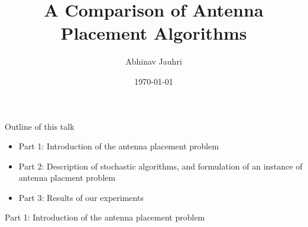 \documentclass{beamer}
\title{\color{univred} A Comparison of Antenna Placement Algorithms}
\author{Abhinav Jauhri}
\date{\today}
\begin{document}
    \begin{frame}
        \color{univred}
        \titlepage
    \end{frame}

    \begin{frame}{Outline of this talk}
        \begin{itemize}
            \setlength\itemsep{2em}
            \item Part 1: Introduction of the antenna placement problem
            \item Part 2: Description of stochastic algorithms, and formulation of an instance of antenna placment problem
            \item Part 3: Results of our experiments
        \end{itemize}
    \end{frame}

    \begin{frame}{\null}
        \begin{tcolorbox}[colback=green!5]
            \centering\Huge
            Part 1: Introduction of the antenna placement problem
        \end{tcolorbox}
    \end{frame}
\end{document}
